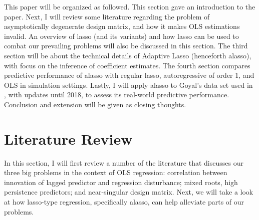\documentclass[12pt,a4paper]{article}
\begin{document}
This paper will be organized as followed. This section gave an introduction to the paper. Next, I will review some literature regarding the problem of asymptotically degenerate design matrix, and how it makes OLS estimations invalid. An overview of lasso (and its variants) and how lasso can be used to combat our prevailing problems will also be discussed in this section. The third section will be about the technical details of Adaptive Lasso (henceforth alasso), with focus on the inference of coefficient estimates. The fourth section compares predictive performance of alasso with regular lasso, autoregressive of order 1, and OLS in simulation settings. Lastly, I will apply alasso to Goyal's data set used in \cite{welch2008comprehensive}, with updates until 2018, to assess its real-world predictive performance. Conclusion and extension will be given as closing thoughts.


\section{Literature Review}
In this section, I will first review a number of the literature that discusses our three big problems in the context of OLS regression: correlation between innovation of lagged predictor and regression disturbance; mixed roots, high persistence predictors; and near-singular design matrix. Next, we will take a look at how lasso-type regression, specifically alasso, can help alleviate parts of our problems.
\end{document}
